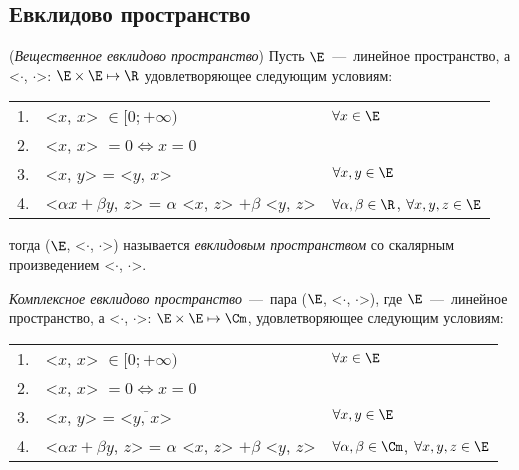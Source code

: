 \subsection{Евклидово пространство}
\begin{definition}
    (\textit{Вещественное евклидово пространство}) Пусть $\E$~---~линейное пространство, а <$\cdot$, $\cdot$>: $\E \times \E \mapsto \R$ удовлетворяющее следующим условиям:
    
\begin{tabular}{lll}
1. & <$x$, $x$> $\in [0; +\infty)$ & $\forall x \in \E$ \\
2. & <$x$, $x$> $= 0 \Leftrightarrow x = 0$ &  \\
3. & <$x$, $y$> = <$y$, $x$> & $\forall x, y \in \E$ \\
4. & <$\alpha x + \beta y$, $z$> = $\alpha$ <$x$, $z$> $+ \beta$ <$y$, $z$> & $\forall \alpha, \beta \in \R$, $\forall x, y, z \in \E$
\end{tabular}

тогда ($\E$, <$\cdot$, $\cdot$>) называется \textit{евклидовым пространством} со скалярным произведением <$\cdot$, $\cdot$>.
\end{definition}
\begin{definition}
    \textit{Комплексное евклидово пространство}~---~пара ($\E$, <$\cdot$, $\cdot$>), где $\E$~---~линейное пространство, а <$\cdot$, $\cdot$>: $\E \times \E \mapsto \Cm$, удовлетворяющее следующим условиям:

\begin{tabular}{lll}
1. & <$x$, $x$> $\in [0; +\infty)$ & $\forall x \in \E$ \\
2. & <$x$, $x$> $= 0 \Leftrightarrow x = 0$ &  \\
3. & <$x$, $y$> = $\overline{\text{<}y\text{, }x\text{>}}$ & $\forall x, y \in \E$ \\
4. & <$\alpha x + \beta y$, $z$> = $\alpha$ <$x$, $z$> $+ \beta$ <$y$, $z$> & $\forall \alpha, \beta \in \Cm$, $\forall x, y, z \in \E$
\end{tabular}
\end{definition}
